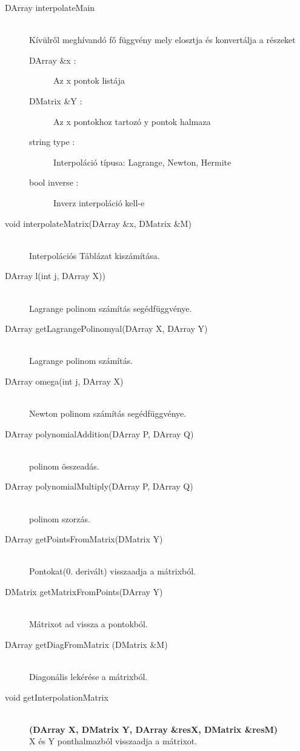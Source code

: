 	\begin{description}
		\item[DArray interpolateMain] 
			\hfill \\ Kívülről meghívandó fő függvény mely elosztja és konvertálja a részeket
			\begin{description}
			  \item[DArray \&x :] Az x pontok listája
			  \item[DMatrix \&Y :] Az x pontokhoz tartozó y pontok halmaza
			  \item[string type :] 
			  	Interpoláció típusa: Lagrange, Newton, Hermite
			  \item[bool inverse :] Inverz interpoláció kell-e
			\end{description}
		\item[void interpolateMatrix(DArray \&x, 	DMatrix \&M)] \hfill \\ 
			Interpolációs Táblázat kiszámítása.
		\item[DArray l(int j, DArray X))] \hfill \\ 
			Lagrange polinom számítás segédfüggvénye.
		\item[DArray getLagrangePolinomyal(DArray X, DArray Y)] \hfill \\ 
			Lagrange polinom számítás.
		\item[DArray omega(int j, DArray X)] \hfill \\ 
			Newton polinom számítás segédfüggvénye.
		\item[DArray polynomialAddition(DArray P, DArray Q)] \hfill \\ 
			polinom összeadás.
		\item[DArray polynomialMultiply(DArray P, DArray Q)] \hfill \\ 
			polinom szorzás.
		\item[DArray getPointsFromMatrix(DMatrix Y)] \hfill \\ 
			Pontokat(0. derivált) visszaadja a mátrixból.
		\item[DMatrix getMatrixFromPoints(DArray Y)] \hfill \\ 
			Mátrixot ad vissza a pontokból.
		\item[DArray getDiagFromMatrix (DMatrix \&M)] 
		\hfill \\
			Diagonális lekérése a mátrixból.
		\item[void getInterpolationMatrix]
		\hfill \\  \textbf{(DArray X, DMatrix Y, DArray \&resX, DMatrix \&resM)}
		\hfill \\
			 X és Y ponthalmazból visszaadja a mátrixot.
	\end{description}
